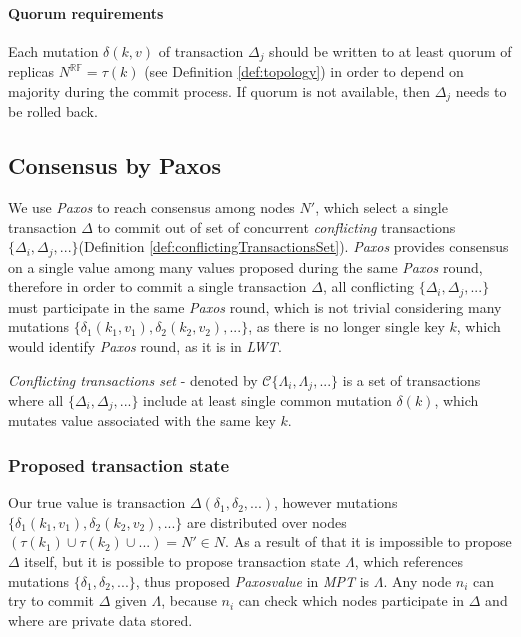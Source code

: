 \documentclass[runningheads,a4paper]{llncs}
\newcommand{\nodesTx}{$\mathit{N'}$\xspace}
\newcommand{\transaction}{$\Delta$\xspace}
\newcommand{\transactionj}{$\Delta_{j}$\xspace}
\newcommand{\transactions}{$\{\Delta_{i}, \Delta_{j}, ...\}$\xspace}
\newcommand{\txStates}{$\{\Lambda_{i}, \Lambda_{j}, ...\}$\xspace}
\newcommand{\conflictingTxSet}{$\mathcal{C}\text{\txStates}$\xspace}
\newcommand{\nodesOfMutations}{$(\tau(k_1) \cup \tau(k_2) \cup ... ) =  \text{\nodesTx}\in\mathit{N}$\xspace}
\newcommand{\mutation}[2]{$\delta(#1, #2)$\xspace}
\newcommand{\mutations}{$\{\delta_{1}, \delta_{2}, ...\}$\xspace}
\newcommand{\mutationsFull}{$\{\delta_{1}(k_1, v_1), \delta_{2}(k_2, v_2), ...\}$\xspace}
\newcommand{\transactionFull}{$\Delta(\delta_{1}, \delta_{2}, ...)$\xspace}
\newcommand{\txState}{$\Lambda$\xspace}
\newcommand{\paxos}{\emph{Paxos}\xspace}
\newcommand{\mpt}{\emph{MPT}\xspace}
\newcommand{\lwt}{\emph{LWT}\xspace}
\newcommand{\node}[1]{$n_{#1}$\xspace}
\begin{document}
\paragraph{Quorum requirements}

Each mutation \mutation{k}{v} of transaction \transactionj should be written to at least quorum of replicas $N^{\mathbb{RF}} = \tau(k)$ (see Definition \ref{def:topology}) in order to depend on majority during the commit process. If quorum is not available, then \transactionj needs to be rolled back. 

\subsection{Consensus by Paxos}

We use \paxos to reach consensus among nodes \nodesTx, which select a single transaction \transaction to commit out of set of concurrent \emph{conflicting} transactions \transactions (Definition \ref{def:conflictingTransactionsSet}). \paxos provides consensus on a single value among many values proposed during the same \paxos round, therefore in order to commit a single transaction \transaction, all conflicting \transactions must participate in the same \paxos round, which is not trivial considering many mutations \mutationsFull, as there is no longer single key $k$, which would identify \paxos round, as it is in \lwt.

\begin{definition}
  \label{def:conflictingTransactionsSet}
  \emph{Conflicting transactions set} - denoted by \conflictingTxSet is a set of transactions where all \transactions include at least single common mutation $\delta(k)$, which mutates value associated with the same key $k$.
\end{definition}

\subsubsection{Proposed transaction state}

Our true value is transaction \transactionFull, however mutations \mutationsFull are distributed over nodes
\nodesOfMutations. As a result of that it is impossible to propose \transaction itself, but it is possible to propose transaction state \txState, which references mutations \mutations, thus proposed \paxos \emph{value} in \mpt is \txState. Any node \node{i} can try to commit \transaction given \txState, because \node{i} can check which nodes participate in \transaction and where are private data stored.
\end{document}
